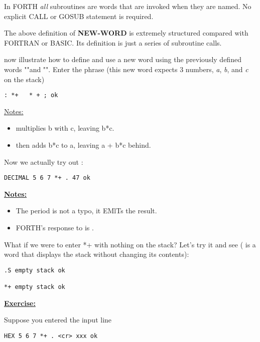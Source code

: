 In FORTH \textit{all} subroutines are words that are invoked when they are named. No explicit CALL or GOSUB statement is required.

The above definition of \textbf{NEW-WORD} is extremely structured compared with FORTRAN or BASIC. Its definition is just a series of subroutine calls.

 now illustrate how to define and use a new word using the previously defined words "\bc{:}"and "\bc{;}". Enter the phrase (this new word \bc{*+} expects 3 numbers, \textit{a}, \textit{b}, and \textit{c} on the stack)

\begin{lstlisting}
: *+   * + ; ok
\end{lstlisting}

\underline{Notes:}
\begin{itemize}
    \item \bc{*} multiplies b with c, leaving b*c.
    \item \bc{+} then adds b*c to a, leaving a + b*c behind.
\end{itemize}

Now we actually try out \bc{*+} :

\begin{lstlisting}
DECIMAL 5 6 7 *+ . 47 ok
\end{lstlisting}

\underline{\textbf{Notes:}}
\begin{itemize}
    \item The period  is not a typo, it EMlTs the result.
    \item FORTH's response to  is .
\end{itemize}

What if we were to enter *+ with nothing on the stack? Let's try it and see ( is a word that displays the stack without changing its contents):

\begin{lstlisting}
.S empty stack ok

*+ empty stack ok
\end{lstlisting}


\underline{\textbf{Exercise:}}

Suppose you entered the input line

\begin{lstlisting}
HEX 5 6 7 *+ . <cr> xxx ok
\end{lstlisting}

